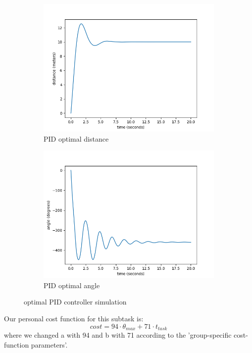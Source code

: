 \documentclass{article}
\begin{document}
\begin{figure}[h]
    \begin{subfigure}[b]{0.5\textwidth}
        \includegraphics[width=\linewidth]{graphs/PID_optimal_distance.png}
        \caption{PID optimal distance}
    \end{subfigure}
    \begin{subfigure}[b]{0.5\textwidth}
        \includegraphics[width=\linewidth]{graphs/PID_optimal_theta.png}
        \caption{PID optimal angle}
    \end{subfigure}
    \caption{optimal PID controller simulation}
    \label{fig:optimal_PID}
\end{figure}

Our personal cost function for this subtask is:
\begin{equation} cost = 94 \cdot \theta_{max} + 71 \cdot t_{task} \end{equation}
where we changed a with 94 and b with 71 according to the 'group-specific cost-function parameters'.
\end{document}

